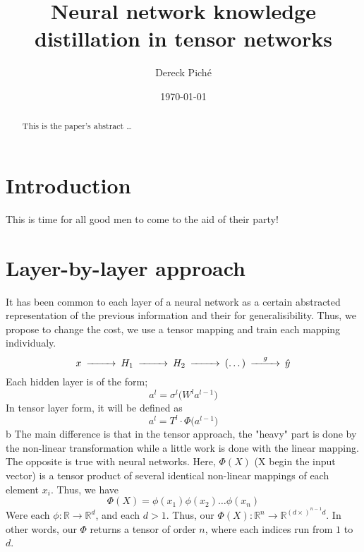 \documentclass[11pt]{article}
\title{Neural network knowledge distillation in tensor networks}
\author{Dereck Piché}
\date{\today}
\begin{document}
\maketitle
\begin{abstract}
This is the paper's abstract \ldots
\end{abstract}

\section{Introduction}
This is time for all good men to come to the aid of their party!

\section{Layer-by-layer approach}
It has been common to each layer of a neural network as a certain abstracted representation of the previous information and their for generalisibility. Thus, we propose to change the cost, we use a tensor mapping and train each mapping individualy.
\begin{equation*}
\begin{CD}
    x @>>>H_1 @>>>H_2 @>>>(\dots)@>g>> \hat{y}
\end{CD}
\end{equation*}
Each hidden layer is of the form;
\begin{equation*}
    a^l = \sigma^l \bigl( W^l a^{l-1} \bigr)
\end{equation*}
In tensor layer form, it will be defined as 
\begin{equation*}
    a^l = T^l \cdot \Phi \bigl( a^{l-1} \bigr)
\end{equation*}b
The main difference is that in the tensor approach, the "heavy" part is done by the non-linear transformation while a little work is done with the linear mapping. The opposite is true with neural networks. Here, $\Phi(X)$ (X begin the input vector) is a tensor product of several identical non-linear mappings of each element $x_i$. Thus, we have 
\begin{equation*}
    \Phi(X) = \phi(x_1)\phi(x_2)\dots\phi(x_n)
\end{equation*}
Were each $\phi : \mathbb{R} \rightarrow \mathbb{R}^d$, and each $d > 1$. Thus, our $\Phi(X) : \mathbb{R}^n \rightarrow \mathbb{R}^{ (d \times)^{n-1}d} $. In other words, our $\Phi$ returns a tensor of order $n$, where each indices run from $1$ to $d$.
\end{document}
